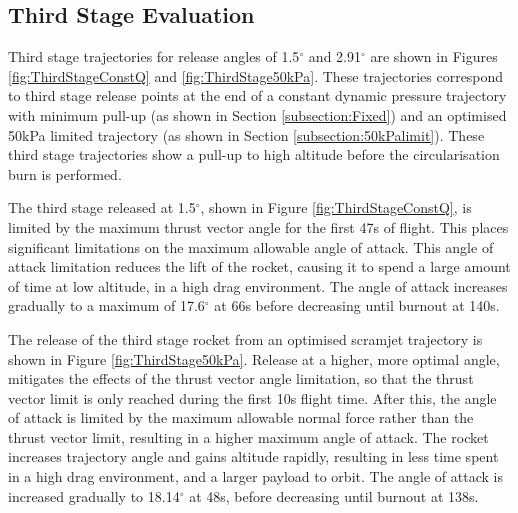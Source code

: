 \documentclass[]{aiaa-tc}
\newcommand{\SeparationAngleConstq}{1.5}
\newcommand{\SeparationAngleFiftykPa}{2.91}
\begin{document}
 
\subsection{Third Stage Evaluation}

Third stage trajectories for release angles of \SeparationAngleConstq $^\circ$ and \SeparationAngleFiftykPa $^\circ$ are shown in Figures \ref{fig:ThirdStageConstQ} and \ref{fig:ThirdStage50kPa}. 
These trajectories correspond to third stage release points at the end of a constant dynamic pressure trajectory with minimum pull-up (as shown in Section \ref{subsection:Fixed}) and an optimised 50kPa limited trajectory  (as shown in Section \ref{subsection:50kPalimit}). 
These third stage trajectories show a pull-up to high altitude before the circularisation burn is performed. 

The third stage released at 1.5$^\circ$, shown in Figure \ref{fig:ThirdStageConstQ}, is limited by the maximum thrust vector angle for the first 47s of flight. This places significant limitations on the maximum allowable angle of attack. This angle of attack limitation reduces the lift of the rocket, causing it to spend a large amount of time at low altitude, in a high drag environment. The angle of attack increases gradually to a maximum of 17.6$^\circ$ at 66s before decreasing until burnout at 140s. 

The release of the third stage rocket from an optimised scramjet trajectory is shown in Figure \ref{fig:ThirdStage50kPa}. Release at a higher, more optimal angle, mitigates the effects of the thrust vector angle limitation, so that the thrust vector limit is only reached during the first 10s flight time. After this, the angle of attack is limited by the maximum allowable normal force rather than the thrust vector limit, resulting in a higher maximum angle of attack. The rocket increases trajectory angle and gains altitude rapidly, resulting in less time spent in a high drag environment, and a larger payload to orbit.  The angle of attack is increased gradually to 18.14$^\circ$ at 48s, before decreasing until burnout at 138s.
\end{document}
